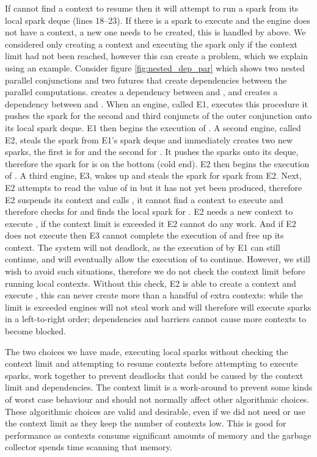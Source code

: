 If \idle cannot find a context to resume then it
will attempt to run a spark from its local spark deque (lines 18--23).
If there is a spark to execute and the engine does not have a context,
a new one needs to be created,
this is handled by \prepareengineforspark above.
We considered only creating a context and executing the spark only if the
context limit had not been reached,
however this can create a problem, which we explain using an example.
Consider figure \ref{fig:nested_dep_par} which shows two nested
parallel conjunctions
and
two futures that create dependencies between the parallel
computations.
 creates a dependency between  and ,
and  creates a dependency between  and .
When an engine, called E1,
executes this procedure it pushes the spark for the second and third
conjuncts of the outer conjunction onto its local spark deque.
E1 then begins the execution of .
A second engine, called E2,
steals the spark from E1's spark deque and immediately creates two new
sparks, the first is for  and the second for .
It pushes the sparks onto its deque,
therefore the spark for  is on the bottom (cold end).
E2 then begins the execution of .
A third engine, E3,
wakes up and steals the spark for  spark from E2.
Next,
E2 attempts to read the value of  in  but it has not yet
been produced,
therefore E2 suspends its context and calls \idle, it cannot find a context
to execute and therefore checks for and finds the local spark for .
E2 needs a new context to execute , if the context limit is exceeded
it E2 cannot do any work.
And if E2 does not execute  then E3 cannot complete the execution of
 and free up its context.
The system will not deadlock, as the execution of  by E1 can still
continue, and will eventually allow the execution of  to continue.
However, we still wish to avoid such situations,
therefore we do not check the context limit before running local contexts.
Without this check,
E2 is able to create a context and execute ,
this can never create more than a handful of extra contexts:
while the limit is exceeded engines will not steal work and will therefore
will execute sparks in a left-to-right order;
dependencies and barriers cannot cause more contexts to become blocked.

The two choices we have made,
executing local sparks without checking the context limit and
attempting to resume contexts before attempting to execute sparks,
work together to prevent deadlocks that could be caused by
the context limit and dependencies.
The context limit is a work-around to prevent some kinds of worst case
behaviour and should not normally affect other algorithmic choices.
These algorithmic choices are valid and desirable,
even if we did not need or use the context limit as they keep the number of
contexts low.
This is good for performance as contexts consume significant amounts of
memory and the garbage collector spends time scanning that memory.

